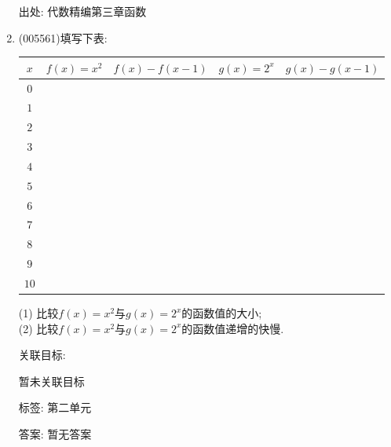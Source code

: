 \documentclass[10pt,a4paper]{article}
\begin{document}
\begin{enumerate}[1.]
出处: 代数精编第三章函数
\item { (005561)}填写下表:
\begin{center}
    \begin{tabular}{|c|c|c|c|c|}
        \hline
        $x$	 & $f(x)=x^2$ & $f(x)-f(x-1)$ & $g(x)=2^x$ & $g(x)-g(x-1)$ \\ \hline
        $0$ & & & & \\ \hline
        $1$ & & & & \\ \hline
        $2$ & & & & \\ \hline
        $3$ & & & & \\ \hline
        $4$ & & & & \\ \hline
        $5$ & & & & \\ \hline
        $6$ & & & & \\ \hline
        $7$ & & & & \\ \hline
        $8$ & & & & \\ \hline
        $9$ & & & & \\ \hline
        $10$ & & & & \\ \hline
    \end{tabular}
\end{center}
(1) 比较$f(x)=x^2$与$g(x)=2^x$的函数值的大小;\\
(2) 比较$f(x)=x^2$与$g(x)=2^x$的函数值递增的快慢.


关联目标:

暂未关联目标



标签: 第二单元

答案: 暂无答案


\end{enumerate}
\end{document}

